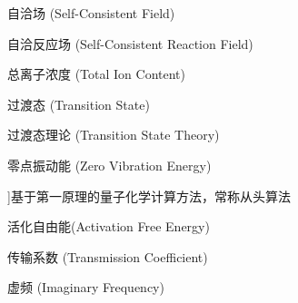 \begin{denotation}[3cm]
  \item[SCF]自洽场 (Self-Consistent Field)
  \item[SCRF]自洽反应场 (Self-Consistent Reaction Field)
  \item[TIC]总离子浓度 (Total Ion Content)
  \item[TS]过渡态 (Transition State)
  \item[TST]过渡态理论 (Transition State Theory)
  \item[ZPE]零点振动能 (Zero Vibration Energy)
  \item[\textit[ab initio]]基于第一原理的量子化学计算方法，常称从头算法
  \item[$\Delta G^\neq$]活化自由能(Activation Free Energy)
  \item[$\kappa$]传输系数 (Transmission Coefficient)
  \item[$\nu_i$]虚频 (Imaginary Frequency)
\end{denotation}






